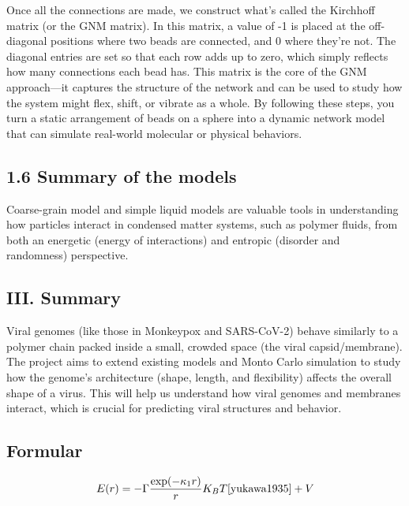 \documentclass[12pt]{article}
\begin{document}
\begin{flushleft}
	Once all the connections are made, we construct what's called the Kirchhoff matrix (or the GNM matrix). In this matrix, a value of -1 is placed at the off-diagonal positions where two beads are connected, and 0 where they're not. The diagonal entries are set so that each row adds up to zero, which simply reflects how many connections each bead has. This matrix is the core of the GNM approach—it captures the structure of the network and can be used to study how the system might flex, shift, or vibrate as a whole. By following these steps, you turn a static arrangement of beads on a sphere into a dynamic network model that can simulate real-world molecular or physical behaviors.












\subsection*{1.6 Summary of the models}
Coarse-grain model and simple liquid models are valuable tools in understanding how particles interact in condensed matter systems, such as polymer fluids, from both an energetic (energy of interactions) and entropic (disorder and randomness) perspective.







\subsection*{III. Summary}
Viral genomes (like those in Monkeypox and SARS-CoV-2) behave similarly to a polymer chain packed inside a small, crowded space (the viral capsid/membrane). The project aims to extend existing models and Monto Carlo simulation to study how the genome's architecture (shape, length, and flexibility) affects the overall shape of a virus. This will help us understand how viral genomes and membranes interact, which is crucial for predicting viral structures and behavior.



\subsection*{Formular}

\begin{equation}
E(r) = -\Gamma \frac{\exp(-\kappa_1 r)}{r} K_B T\cite{yukawa1935} +V
\end{equation}


\end{flushleft}
\end{document}
